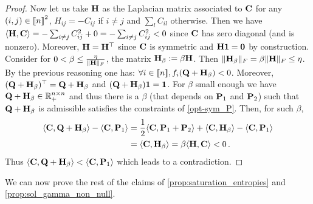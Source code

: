 \begin{proof}
Now let us take $\mathbf{H}$ as the Laplacian matrix associated to $\mathbf{C}$ \ie for any $(i,j) \in {[\![n]\!]}^2$, $H_{ij} = -C_{ij}$ if $i \neq j$ and $\sum_l C_{il}$ otherwise.
Then we have $\langle \mathbf{H}, \mathbf{C} \rangle = -\sum_{i \neq j} C_{ij}^2+ 0 = - \sum_{i \neq j} C_{ij}^2 < 0$ since $\mathbf{C}$ has zero diagonal (and is nonzero). Moreover, $\mathbf{H} = \mathbf{H}^\top$ since $\mathbf{C}$ is symmetric and $\mathbf{H} \bm{1} = \bm{0}$ by construction. Consider for $0 < \beta \leq \frac{\eta}{\|\mathbf{H}\|_F}$, the matrix $\mathbf{H}_{\beta} := \beta \mathbf{H}$. Then $\|\mathbf{H}_\beta\|_F = \beta \|\mathbf{H}\|_F \leq \eta$. By the previous reasoning one has: $\forall i \in {[\![n]\!]}, f_i(\mathbf{Q}+\mathbf{H}_{\beta}) < 0$. Moreover, $(\mathbf{Q}+\mathbf{H}_{\beta})^{\top} = \mathbf{Q}+\mathbf{H}_{\beta}$ and $(\mathbf{Q}+\mathbf{H}_{\beta})\bm{1} = \bm{1}$. For $\beta$ small enough we have $\mathbf{Q}+\mathbf{H}_{\beta}\in \mathbb{R}_{+}^{n \times n}$ and thus there is a $\beta$ (that depends on $\mathbf{P}_1$ and $\mathbf{P}_2$) such that $\mathbf{Q}+\mathbf{H}_{\beta}$ is admissible \ie satisfies the constraints of \eqref{opt-sym_P}. Then, for such $\beta$, 
\begin{equation}
\begin{split}
\langle \mathbf{C}, \mathbf{Q}+\mathbf{H}_{\beta} \rangle- \langle \mathbf{C}, \mathbf{P}_1 \rangle &= \frac{1}{2} \langle \mathbf{C}, \mathbf{P}_1+ \mathbf{P}_2 \rangle + \langle \mathbf{C}, \mathbf{H}_{\beta} \rangle -\langle \mathbf{C}, \mathbf{P}_1 \rangle\\
&= \langle \mathbf{C}, \mathbf{H}_{\beta} \rangle = \beta \langle \mathbf{H}, \mathbf{C} \rangle < 0\,.
\end{split}
\end{equation}
Thus $\langle \mathbf{C}, \mathbf{Q}+\mathbf{H}_{\beta} \rangle <\langle \mathbf{C}, \mathbf{P}_1 \rangle$ which leads to a contradiction.
\end{proof}
We can now prove the rest of the claims of  \cref{prop:saturation_entropies} and \cref{prop:sol_gamma_non_null}.
